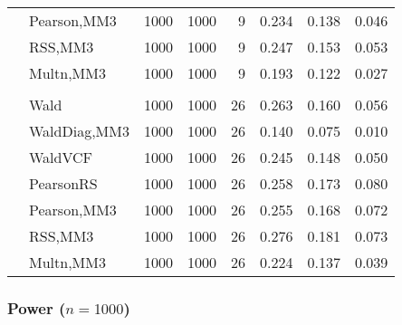 \documentclass[
]{article}
\begin{document}
\begin{table}[H]
{\begin{tabular}[t]{llrrrrrr}
\hspace{1em} & Pearson,MM3 & 1000 & 1000 & 9 & 0.234 & 0.138 & 0.046\\

\hspace{1em} & RSS,MM3 & 1000 & 1000 & 9 & 0.247 & 0.153 & 0.053\\

\hspace{1em} & Multn,MM3 & 1000 & 1000 & 9 & 0.193 & 0.122 & 0.027\\
\cmidrule{1-8}
\addlinespace[0.3em]
\multicolumn{8}{l}{\textbf{3F 15V}}\\
\hspace{1em} & Wald & 1000 & 1000 & 26 & 0.263 & 0.160 & 0.056\\

\hspace{1em} & WaldDiag,MM3 & 1000 & 1000 & 26 & 0.140 & 0.075 & 0.010\\

\hspace{1em} & WaldVCF & 1000 & 1000 & 26 & 0.245 & 0.148 & 0.050\\

\hspace{1em} & PearsonRS & 1000 & 1000 & 26 & 0.258 & 0.173 & 0.080\\

\hspace{1em} & Pearson,MM3 & 1000 & 1000 & 26 & 0.255 & 0.168 & 0.072\\

\hspace{1em} & RSS,MM3 & 1000 & 1000 & 26 & 0.276 & 0.181 & 0.073\\

\hspace{1em} & Multn,MM3 & 1000 & 1000 & 26 & 0.224 & 0.137 & 0.039\\
\bottomrule
\end{tabular}}
\end{table}

\hypertarget{power-n1000}{%
\subsubsection{\texorpdfstring{Power
(\(n=1000\))}{Power (n=1000)}}\label{power-n1000}}
\end{document}

